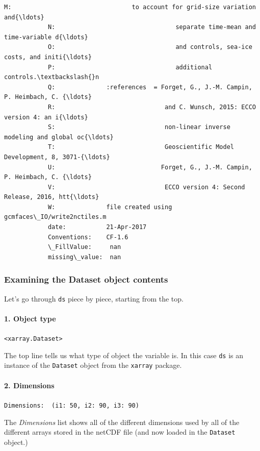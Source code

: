 \documentclass[11pt]{article}
\begin{document}
\begin{Verbatim}[commandchars=\\\{\}]
            M:                                 to account for grid-size variation and{\ldots}
            N:                                 separate time-mean and time-variable d{\ldots}
            O:                                 and controls, sea-ice costs, and initi{\ldots}
            P:                                 additional controls.\textbackslash{}n 
            Q:              :references  = Forget, G., J.-M. Campin, P. Heimbach, C. {\ldots}
            R:                              and C. Wunsch, 2015: ECCO version 4: an i{\ldots}
            S:                              non-linear inverse modeling and global oc{\ldots}
            T:                              Geoscientific Model Development, 8, 3071-{\ldots}
            U:                             Forget, G., J.-M. Campin, P. Heimbach, C. {\ldots}
            V:                              ECCO version 4: Second Release, 2016, htt{\ldots}
            W:              file created using gcmfaces\_IO/write2nctiles.m
            date:           21-Apr-2017
            Conventions:    CF-1.6
            \_FillValue:     nan
            missing\_value:  nan
\end{Verbatim}
            
    \subsubsection{Examining the Dataset object
contents}\label{examining-the-dataset-object-contents}

Let's go through \texttt{ds} piece by piece, starting from the top.

\paragraph{1. Object type}\label{object-type}

\texttt{\textless{}xarray.Dataset\textgreater{}}

The top line tells us what type of object the variable is. In this case
\texttt{ds} is an instance of the \texttt{Dataset} object from the
\texttt{xarray} package.

\paragraph{2. Dimensions}\label{dimensions}

\texttt{Dimensions:\ \ (i1:\ 50,\ i2:\ 90,\ i3:\ 90)}

The \emph{Dimensions} list shows all of the different dimensions used by
all of the different arrays stored in the netCDF file (and now loaded in
the \texttt{Dataset} object.)
\end{document}
